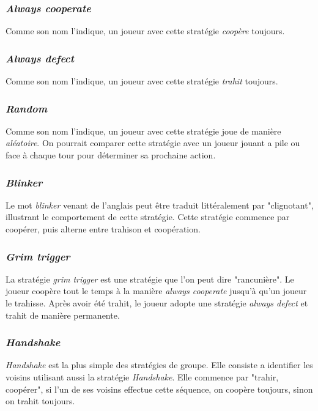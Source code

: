 \documentclass[a4paper, french]{article}
\begin{document}
\subsubsection{\textit{Always cooperate}}
Comme son nom l'indique, un joueur avec cette stratégie \textit{coopère} toujours.

\subsubsection{\textit{Always defect}}
Comme son nom l'indique, un joueur avec cette stratégie \textit{trahit} toujours.

\subsubsection{\textit{Random}}
Comme son nom l'indique, un joueur avec cette stratégie joue de manière \textit{aléatoire}. On pourrait comparer cette stratégie avec un joueur jouant a pile ou face à chaque tour pour déterminer sa prochaine action.

\subsubsection{\textit{Blinker}}
Le mot \textit{blinker} venant de l'anglais peut être traduit littéralement par "clignotant", illustrant le comportement de cette stratégie. Cette stratégie commence par coopérer, puis alterne entre trahison et coopération.

\subsubsection{\textit{Grim trigger}}
La stratégie \textit{grim trigger} est une stratégie que l'on peut dire "rancunière". Le joueur coopère tout le temps à la manière \textit{always cooperate} jusqu'à qu'un joueur le trahisse. Après avoir été trahit, le joueur adopte une stratégie \textit{always defect} et trahit de manière permanente.

\subsubsection{\textit{Handshake}}
\textit{Handshake} est la plus simple des stratégies de groupe. Elle consiste a identifier les voisins utilisant aussi la stratégie \textit{Handshake}. Elle commence par "trahir, coopérer", si l'un de ses voisins effectue cette séquence, on coopère toujours, sinon on trahit toujours.
\end{document}

